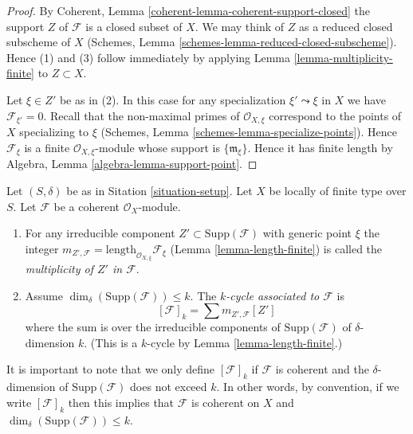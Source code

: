 \begin{proof}
By Coherent, Lemma \ref{coherent-lemma-coherent-support-closed}
the support $Z$ of $\mathcal{F}$ is a closed subset of $X$.
We may think of $Z$ as a reduced closed subscheme of $X$
(Schemes, Lemma \ref{schemes-lemma-reduced-closed-subscheme}).
Hence (1) and (3) follow immediately by applying
Lemma \ref{lemma-multiplicity-finite} to $Z \subset X$.

\medskip\noindent
Let $\xi \in Z'$ be as in (2). In this case for any specialization
$\xi' \leadsto \xi$ in $X$ we have $\mathcal{F}_{\xi'} = 0$.
Recall that the non-maximal primes of $\mathcal{O}_{X, \xi}$ correspond
to the points of $X$ specializing to $\xi$
(Schemes, Lemma \ref{schemes-lemma-specialize-points}).
Hence $\mathcal{F}_\xi$ is a finite $\mathcal{O}_{X, \xi}$-module
whose support is $\{\mathfrak m_\xi\}$. Hence it has finite length
by Algebra, Lemma \ref{algebra-lemma-support-point}.
\end{proof}

\begin{definition}
\label{definition-cycle-associated-to-coherent-sheaf}
Let $(S, \delta)$ be as in Sitation \ref{situation-setup}.
Let $X$ be locally of finite type over $S$.
Let $\mathcal{F}$ be a coherent $\mathcal{O}_X$-module.
\begin{enumerate}
\item For any irreducible component $Z' \subset \text{Supp}(\mathcal{F})$
with generic point $\xi$ the integer
$m_{Z', \mathcal{F}} = \text{length}_{\mathcal{O}_{X, \xi}} \mathcal{F}_\xi$
(Lemma \ref{lemma-length-finite})
is called the {\it multiplicity of $Z'$ in $\mathcal{F}$}.
\item Assume $\dim_\delta(\text{Supp}(\mathcal{F})) \leq k$.
The {\it $k$-cycle associated to $\mathcal{F}$} is
$$
[\mathcal{F}]_k
=
\sum m_{Z', \mathcal{F}}[Z']
$$
where the sum is over the irreducible components of
$\text{Supp}(\mathcal{F})$ of $\delta$-dimension $k$.
(This is a $k$-cycle by Lemma \ref{lemma-length-finite}.)
\end{enumerate}
\end{definition}

\noindent
It is important to note that we only define $[\mathcal{F}]_k$
if $\mathcal{F}$ is coherent and the $\delta$-dimension
of $\text{Supp}(\mathcal{F})$ does not exceed $k$. In other words,
by convention, if we write $[\mathcal{F}]_k$ then this implies that
$\mathcal{F}$ is coherent on $X$ and
$\dim_\delta(\text{Supp}(\mathcal{F})) \leq k$.

